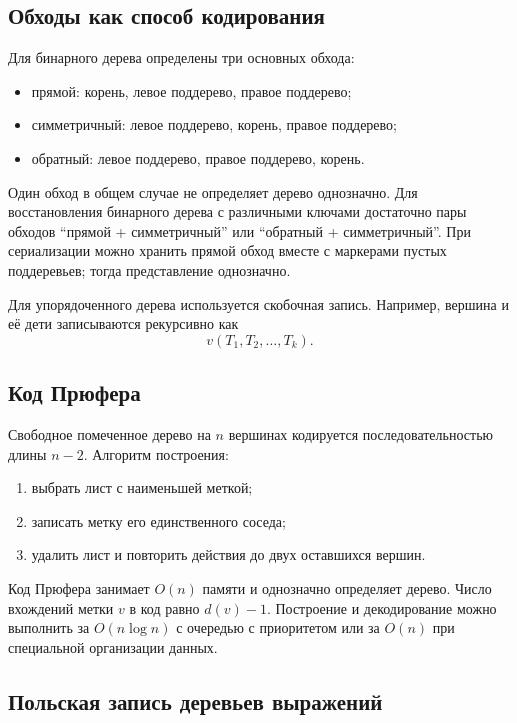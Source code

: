 \subsection{Обходы как способ кодирования}

Для бинарного дерева определены три основных обхода:
\begin{itemize}
    \item прямой: корень, левое поддерево, правое поддерево;
    \item симметричный: левое поддерево, корень, правое поддерево;
    \item обратный: левое поддерево, правое поддерево, корень.
\end{itemize}

Один обход в общем случае не определяет дерево однозначно. Для восстановления
бинарного дерева с различными ключами достаточно пары обходов ``прямой +
симметричный'' или ``обратный + симметричный''. При сериализации можно хранить
прямой обход вместе с маркерами пустых поддеревьев; тогда представление однозначно.

Для упорядоченного дерева используется скобочная запись. Например, вершина и её
дети записываются рекурсивно как
\[
    v(T_1,T_2,\ldots,T_k).
\]

\subsection{Код Прюфера}

Свободное помеченное дерево на $n$ вершинах кодируется последовательностью длины
$n-2$. Алгоритм построения:
\begin{enumerate}
    \item выбрать лист с наименьшей меткой;
    \item записать метку его единственного соседа;
    \item удалить лист и повторить действия до двух оставшихся вершин.
\end{enumerate}

Код Прюфера занимает $O(n)$ памяти и однозначно определяет дерево. Число
вхождений метки $v$ в код равно $d(v)-1$. Построение и декодирование можно
выполнить за $O(n\log n)$ с очередью с приоритетом или за $O(n)$ при специальной
организации данных.

\subsection{Польская запись деревьев выражений}

